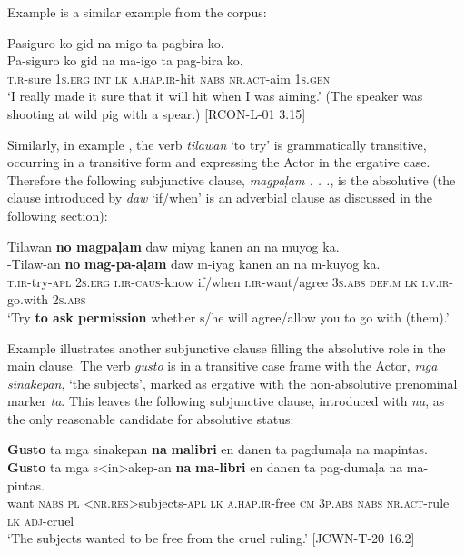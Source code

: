 Example  is a similar example from the corpus:

\ea
\label{ex:iwasaiming}
Pasiguro ko gid na migo ta pagbira ko. \\
\gll Pa-siguro	ko	gid	na	ma-igo	ta	pag-bira	ko. \\
\textsc{t.r}-sure	1\textsc{s.erg}	\textsc{int}	\textsc{lk}	\textsc{a.hap.ir}-hit	\textsc{nabs}	\textsc{nr.act}-aim	1\textsc{s.gen} \\
\glt ‘I really made it sure that it will hit when I was aiming.’ (The speaker was shooting at wild pig with a spear.) [RCON-L-01 3.15]
\z

Similarly, in example , the verb \textit{tilawan} ‘to try’ is grammatically transitive, occurring in a transitive form and expressing the Actor in the ergative case. Therefore the following subjunctive clause, \textit{magpaļam . . .}, is the absolutive (the clause introduced by \textit{daw} ‘if/when’ is an adverbial clause as discussed in the following section):

\ea
\label{bkm:Ref474831142}
Tilawan  \textbf{no  magpaļam}  daw  miyag  kanen  an na  muyog   ka. \smallskip\\
\gll \emptyset{}-Tilaw-an  \textbf{no}  \textbf{mag-pa-aļam}  daw  m-iyag  kanen  an na  m-kuyog   ka. \\
\textsc{t.ir}-try-\textsc{apl}  2\textsc{s.erg}  \textsc{i.ir}-\textsc{caus}-know  if/when  \textsc{i.ir}-want/agree  3\textsc{s.abs}  \textsc{def.m} \textsc{lk}  \textsc{i.v.ir}-go.with  2\textsc{s.abs} \\
\glt `Try \textbf{to ask permission} whether s/he will agree/allow you to go with (them).’
\z

Example  illustrates another subjunctive clause filling the absolutive role in the main clause. The verb \textit{gusto} is in a transitive case frame with the Actor, \textit{mga sinakepan}, ‘the subjects’, marked as ergative with the non-absolutive prenominal marker \textit{ta}. This leaves the following subjunctive clause, introduced with \textit{na}, as the only reasonable candidate for absolutive status:

\ea
\label{bkm:Ref474832038}
\textbf{Gusto}  ta  mga  sinakepan  \textbf{na}  \textbf{malibri}  en  danen  ta pagdumaļa  na  mapintas. \smallskip\\
\gll \textbf{Gusto}  ta  mga  s<in>akep-an  \textbf{na}  \textbf{ma-libri}  en  danen  ta pag-dumaļa  na  ma-pintas. \\
want  \textsc{nabs}  \textsc{pl}  <\textsc{nr.res}>subjects-\textsc{apl}  \textsc{lk}  \textsc{a.hap.ir}-free  \textsc{cm}  3\textsc{p.abs}  \textsc{nabs}
\textsc{nr.act}-rule  \textsc{lk}  \textsc{adj}-cruel \\
\glt `The subjects wanted to be free from the cruel ruling.’ [JCWN-T-20 16.2]
\z

